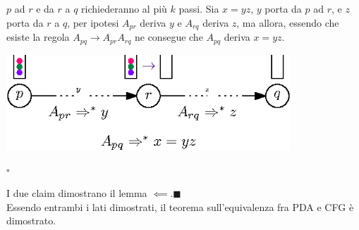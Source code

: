 \documentclass[10pt, letterpaper]{report}
\begin{document}
\begin{itemize}
\begin{itemize}
        $p$ ad $r$ e da $r$ a $q$ richiederanno al più $k$ passi. Sia $x=yz$, $y$ porta da  $p$ ad $r$, e 
        $z$ porta da $r$ a $q$, per ipotesi $A_{pr}$ deriva $y$ e $A_{rq}$ deriva $z$, 
        ma allora, essendo che esiste la regola $A_{pq}\longrightarrow A_{pr}A_{rq}$ ne consegue che 
        $A_{pq}$ deriva $x=yz$.\begin{center}
            \includegraphics[width=0.8\textwidth ]{images/dimoPDACFG2.eps}
        \end{center}
    \end{itemize}
    \hfill $\square$
\end{itemize}
I due claim dimostrano il lemma $\impliedby$.\hfill $\blacksquare$\\
Essendo entrambi i lati dimostrati, il teorema sull'equivalenza fra PDA e CFG è dimostrato.
\end{document}
